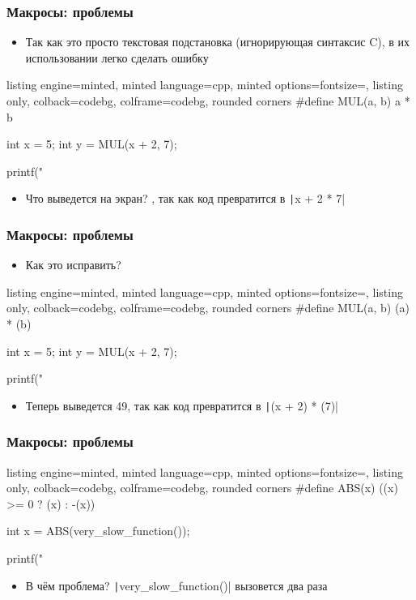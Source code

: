 \documentclass[10pt]{beamer}
\begin{document}
\begin{frame}[fragile]
\frametitle{Макросы: проблемы}
\begin{itemize}
\item Так как это просто текстовая подстановка (игнорирующая синтаксис C), в их использовании легко сделать ошибку
\end{itemize}
\pause
{}
\begin{tcblisting}{listing engine=minted, minted language=cpp, minted options={fontsize=\scriptsize}, listing only, colback=codebg, colframe=codebg, rounded corners}
#define MUL(a, b) a * b

int x = 5;
int y = MUL(x + 2, 7);

printf("%
\end{tcblisting}
\pause
{}
\begin{itemize}
\item Что выведется на экран? , так как код превратится в \texttt|x + 2 * 7|
\end{itemize}
\end{frame}

\begin{frame}[fragile]
\frametitle{Макросы: проблемы}
\begin{itemize}
\item Как это исправить?
\end{itemize}
\pause
{}
\begin{tcblisting}{listing engine=minted, minted language=cpp, minted options={fontsize=\scriptsize}, listing only, colback=codebg, colframe=codebg, rounded corners}
#define MUL(a, b) (a) * (b)

int x = 5;
int y = MUL(x + 2, 7);

printf("%
\end{tcblisting}
\pause
{}
\begin{itemize}
\item Теперь выведется 49, так как код превратится в \texttt|(x + 2) * (7)|
\end{itemize}
\end{frame}

\begin{frame}[fragile]
\frametitle{Макросы: проблемы}
\begin{tcblisting}{listing engine=minted, minted language=cpp, minted options={fontsize=\scriptsize}, listing only, colback=codebg, colframe=codebg, rounded corners}
#define ABS(x) ((x) >= 0 ? (x) : -(x))

int x = ABS(very_slow_function());

printf("%
\end{tcblisting}
\pause
{}
\begin{itemize}
\item В чём проблема? \pause \texttt|very_slow_function()| вызовется два раза
\end{itemize}
\end{frame}
\end{document}
